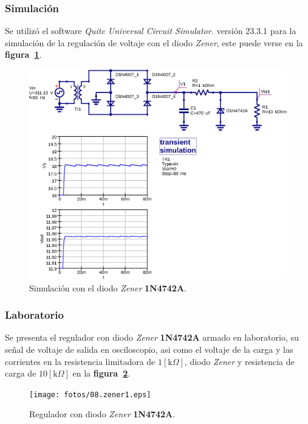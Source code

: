 \subsubsection{Simulación}
Se utilizó el software \emph{Quite Universal Circuit Simulator.} versión 23.3.1
para la simulación de la regulación de voltaje con el diodo \emph{Zener}, este
puede verse en la \textbf{figura~\ref{simulacion08}}.

\begin{figure}[!h]
\centering
\includegraphics[scale=0.75]{simulacion/08.zener1.eps}
\caption{Simulación con el diodo \emph{Zener} \textbf{1N4742A}.}
\label{simulacion08}
\end{figure}

\subsubsection{Laboratorio}
Se presenta el regulador con diodo \emph{Zener} \textbf{1N4742A} armado en
laboratorio, su señal de voltaje de salida en osciloscopio, asi como el voltaje
de la carga y las corrientes en la resistencia limitadora de
$1[\text{k}\Omega]$, diodo \emph{Zener} y resistencia de carga de
$10[\text{k}\Omega]$ en la \textbf{figura~\ref{laboratorio10}}.

\begin{figure}[!h]
\centering
\texttt{[image: fotos/08.zener1.eps]}
\caption{Regulador con diodo \emph{Zener} \textbf{1N4742A}.}
\label{laboratorio10}
\end{figure}

